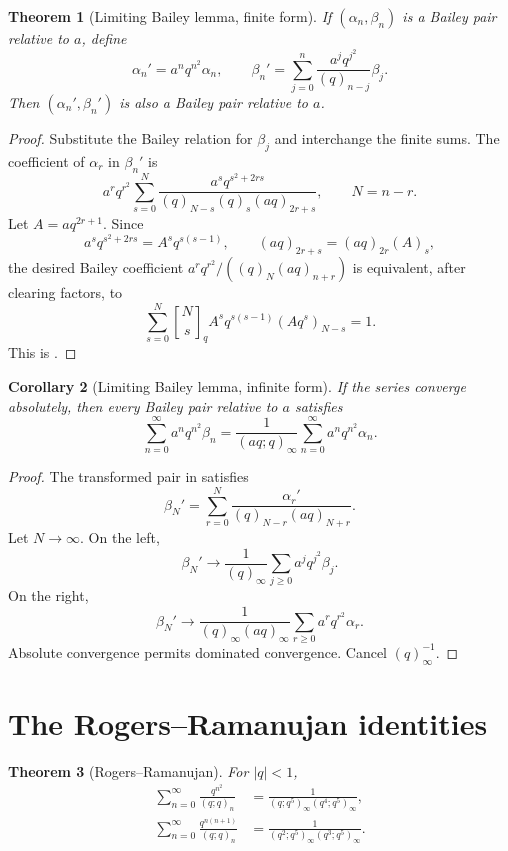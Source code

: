 \documentclass[11pt,oneside,openany]{book}
\newtheorem{theorem}{Theorem}[chapter]
\newtheorem{corollary}[theorem]{Corollary}
\theoremstyle{definition}
\theoremstyle{remark}
\newcommand{\qbinom}[2]{\genfrac{[}{]}{0pt}{}{#1}{#2}_{q}}
\newcommand{\abs}[1]{\lvert #1\rvert}
\begin{document}
\begin{theorem}[Limiting Bailey lemma, finite form]\label{thm:bailey-limit-finite}
If $(\alpha_n,\beta_n)$ is a Bailey pair relative to $a$, define
\[
 \alpha_n'=a^nq^{n^2}\alpha_n,
 \qquad
 \beta_n'=\sum_{j=0}^{n}\frac{a^jq^{j^2}}{(q)_{n-j}}\beta_j.
\]
Then $(\alpha_n',\beta_n')$ is also a Bailey pair relative to $a$.
\end{theorem}

\begin{proof}
Substitute the Bailey relation for $\beta_j$ and interchange the finite sums.  The coefficient of $\alpha_r$ in $\beta_n'$ is
\[
 a^rq^{r^2}\sum_{s=0}^{N}
 \frac{a^sq^{s^2+2rs}}
 {(q)_{N-s}(q)_s(aq)_{2r+s}},
 \qquad N=n-r.
\]
Let $A=aq^{2r+1}$.  Since
\[
 a^sq^{s^2+2rs}=A^sq^{s(s-1)},
 \qquad
 (aq)_{2r+s}=(aq)_{2r}(A)_s,
\]
the desired Bailey coefficient
\(
 a^rq^{r^2}/((q)_N(aq)_{n+r})
\)
is equivalent, after clearing factors, to
\[
 \sum_{s=0}^{N}\qbinom Ns A^sq^{s(s-1)}(Aq^s)_{N-s}=1.
\]
This is .
\end{proof}

\begin{corollary}[Limiting Bailey lemma, infinite form]\label{cor:bailey-limit-infinite}
If the series converge absolutely, then every Bailey pair relative to $a$ satisfies
\[
 \sum_{n=0}^{\infty}a^nq^{n^2}\beta_n
 =\frac1{(aq;q)_\infty}
 \sum_{n=0}^{\infty}a^nq^{n^2}\alpha_n.
\]
\end{corollary}

\begin{proof}
The transformed pair in  satisfies
\[
 \beta_N'=\sum_{r=0}^{N}
 \frac{\alpha_r'}{(q)_{N-r}(aq)_{N+r}}.
\]
Let $N\to\infty$.  On the left,
\[
 \beta_N'\longrightarrow\frac1{(q)_\infty}
 \sum_{j\ge0}a^jq^{j^2}\beta_j.
\]
On the right,
\[
 \beta_N'\longrightarrow
 \frac1{(q)_\infty(aq)_\infty}
 \sum_{r\ge0}a^rq^{r^2}\alpha_r.
\]
Absolute convergence permits dominated convergence.  Cancel $(q)_\infty^{-1}$.
\end{proof}

\section{The Rogers--Ramanujan identities}

\begin{theorem}[Rogers--Ramanujan]\label{thm:rogers-ramanujan}
For $\abs q<1$,
\begin{align}
 \sum_{n=0}^{\infty}\frac{q^{n^2}}{(q;q)_n}
 &=\frac1{(q;q^5)_\infty(q^4;q^5)_\infty},\label{eq:RR1}\\
 \sum_{n=0}^{\infty}\frac{q^{n(n+1)}}{(q;q)_n}
 &=\frac1{(q^2;q^5)_\infty(q^3;q^5)_\infty}.
 \label{eq:RR2}
\end{align}
\end{theorem}
\end{document}
